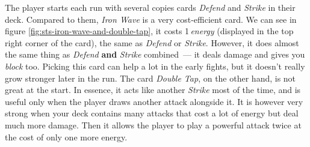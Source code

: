 The player starts each run with several copies cards \emph{Defend} and \emph{Strike} in their deck.
Compared to them, \emph{Iron Wave} is a very cost-efficient card.
We can see in figure \ref{fig:sts-iron-wave-and-double-tap}, it costs 1\,\emph{energy} (displayed in the top right corner of the card), the same as \emph{Defend} or \emph{Strike}.
However, it does almost the same thing as \emph{Defend} \textbf{and} \emph{Strike} combined~--- it deals damage and gives you \emph{block} too.
Picking this card can help a lot in the early fights, but it doesn't really grow stronger later in the run.
The card \emph{Double Tap}, on the other hand, is not great at the start.
In essence, it acts like another \emph{Strike} most of the time, and is useful only when the player draws another attack alongside it.
It is however very strong when your deck contains many attacks that cost a lot of energy but deal much more damage.
Then it allows the player to play a powerful attack twice at the cost of only one more energy.

